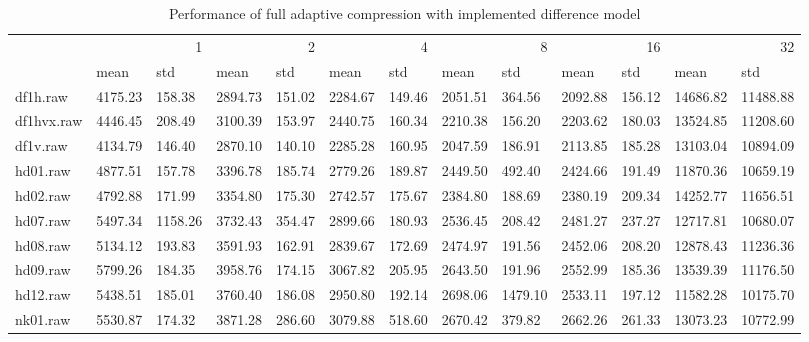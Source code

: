 \begin{table}
\caption{Performance of full adaptive compression with implemented difference model}
\begin{tabular}{lllllllllllll}
 & \multicolumn{2}{r}{1} & \multicolumn{2}{r}{2} & \multicolumn{2}{r}{4} & \multicolumn{2}{r}{8} & \multicolumn{2}{r}{16} & \multicolumn{2}{r}{32} \\
 & mean & std & mean & std & mean & std & mean & std & mean & std & mean & std \\
df1h.raw & 4175.23 & 158.38 & 2894.73 & 151.02 & 2284.67 & 149.46 & 2051.51 & 364.56 & 2092.88 & 156.12 & 14686.82 & 11488.88 \\
df1hvx.raw & 4446.45 & 208.49 & 3100.39 & 153.97 & 2440.75 & 160.34 & 2210.38 & 156.20 & 2203.62 & 180.03 & 13524.85 & 11208.60 \\
df1v.raw & 4134.79 & 146.40 & 2870.10 & 140.10 & 2285.28 & 160.95 & 2047.59 & 186.91 & 2113.85 & 185.28 & 13103.04 & 10894.09 \\
hd01.raw & 4877.51 & 157.78 & 3396.78 & 185.74 & 2779.26 & 189.87 & 2449.50 & 492.40 & 2424.66 & 191.49 & 11870.36 & 10659.19 \\
hd02.raw & 4792.88 & 171.99 & 3354.80 & 175.30 & 2742.57 & 175.67 & 2384.80 & 188.69 & 2380.19 & 209.34 & 14252.77 & 11656.51 \\
hd07.raw & 5497.34 & 1158.26 & 3732.43 & 354.47 & 2899.66 & 180.93 & 2536.45 & 208.42 & 2481.27 & 237.27 & 12717.81 & 10680.07 \\
hd08.raw & 5134.12 & 193.83 & 3591.93 & 162.91 & 2839.67 & 172.69 & 2474.97 & 191.56 & 2452.06 & 208.20 & 12878.43 & 11236.36 \\
hd09.raw & 5799.26 & 184.35 & 3958.76 & 174.15 & 3067.82 & 205.95 & 2643.50 & 191.96 & 2552.99 & 185.36 & 13539.39 & 11176.50 \\
hd12.raw & 5438.51 & 185.01 & 3760.40 & 186.08 & 2950.80 & 192.14 & 2698.06 & 1479.10 & 2533.11 & 197.12 & 11582.28 & 10175.70 \\
nk01.raw & 5530.87 & 174.32 & 3871.28 & 286.60 & 3079.88 & 518.60 & 2670.42 & 379.82 & 2662.26 & 261.33 & 13073.23 & 10772.99 \\
\end{tabular}
\end{table}
